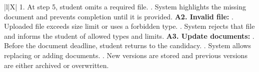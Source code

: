\begin{xltabular}{\textwidth}{|l|X|}
        1. At step 5, student omits a required file. . System highlights the missing document and prevents completion until it is provided. \newline
        \textbf{A2. Invalid file:} . Uploaded file exceeds size limit or uses a forbidden type. . System rejects that file and informs the student of allowed types and limits. \newline
        \textbf{A3. Update documents:} . Before the document deadline, student returns to the candidacy. . System allows replacing or adding documents. . New versions are stored and previous versions are either archived or overwritten. \\ \hline
\end{xltabular}

